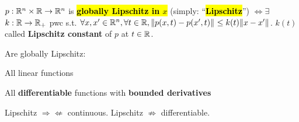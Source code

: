 \begin{Definition}
$p:\mathbb R^n\times\mathbb R\to\mathbb R^n$ is \textbf{\hl{globally Lipschitz in $x$}} (simply: ``\textbf{\hl{Lipschitz}}'') $\Leftrightarrow\exists$ $k:\mathbb R\to\mathbb R_+$ pwc s.t. $\forall x,x'\in\mathbb R^n,\forall t\in\mathbb R,\|p(x,t)-p(x',t)\|_{}\le k(t)\|x-x'\|_{}$. $k(t)$ called \textbf{Lipschitz constant} of $p$ at $t\in\mathbb R$.
\end{Definition}
\begin{Fact}
Are globally Lipschitz:
\begin{enumerate*}
  \item All linear functions
  \item All \textbf{differentiable} functions with \textbf{bounded derivatives}
\end{enumerate*}
\end{Fact}
Lipschitz $\Rightarrow\nLeftarrow$ continuous. Lipschitz $\nRightarrow$ differentiable.

